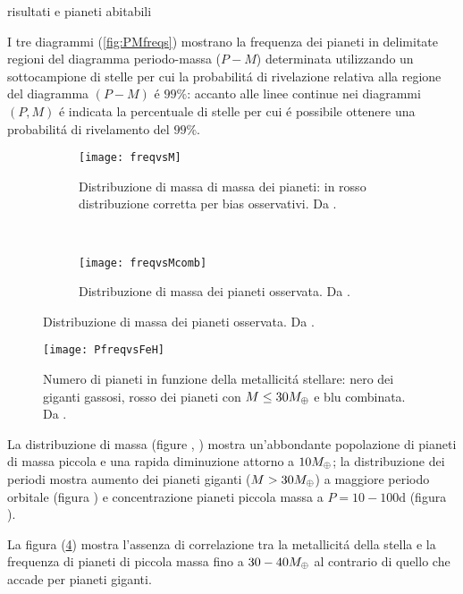 \begin{workout}
risultati e pianeti abitabili
\end{workout}

I tre diagrammi (\ref{fig:PMfreqs}) mostrano la frequenza dei pianeti in delimitate regioni del diagramma periodo-massa ($P-M$) determinata utilizzando un sottocampione di stelle per cui la probabilit\'a di rivelazione relativa alla regione del diagramma $(P-M)$ \'e $99\%$: accanto alle linee continue nei diagrammi $(P,M)$ \'e indicata la percentuale di stelle per cui \'e possibile ottenere una probabilit\'a di rivelamento del $99\%$.

\begin{figure}[!ht]
\begin{subfigure}[b]{0.49\textwidth} \centering \texttt{[image: freqvsM]}
\caption{Distribuzione di massa di massa dei pianeti: in rosso distribuzione corretta per bias osservativi. Da \cite{mayor2011harps}.}\label{fig:freqvsM}
\end{subfigure}
~
\begin{subfigure}[b]{0.49\textwidth} \centering \texttt{[image: freqvsMcomb]}
\caption{Distribuzione di massa dei pianeti osservata. Da \cite{mayor2011harps}.}\label{fig:freqvsMcomb}
\end{subfigure}
\end{figure}

\begin{figure}[!ht]
\centering \texttt{[image: PfreqvsFeH]}
\caption{Numero di pianeti in funzione della metallicit\'a stellare: nero dei giganti gassosi, rosso dei pianeti con $M\leq30M_{\oplus}{}$ e blu combinata. Da \cite{mayor2011harps}.}\label{fig:PfreqvsFeH}
\end{figure}

La distribuzione di massa (figure , ) mostra un'abbondante popolazione di pianeti di massa piccola e una rapida diminuzione attorno a $10M_{\oplus}{}$; la distribuzione dei periodi mostra aumento dei pianeti giganti ($M>30M_{\oplus}{}$) a maggiore periodo orbitale (figura ) e concentrazione pianeti piccola massa a $P=10-100\si{\day}$ (figura ).

La figura (\ref{fig:PfreqvsFeH}) mostra l'assenza di correlazione tra la metallicit\'a della stella e la frequenza di pianeti di piccola massa fino a $30-40M_{\oplus}{}$ al contrario di quello che accade per pianeti giganti.

